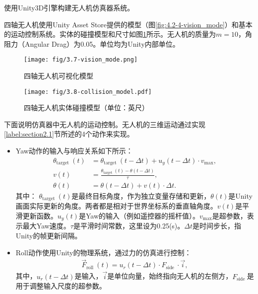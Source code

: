 使用Unity3D引擎构建无人机仿真器系统。

四轴无人机使用Unity Asset Store提供的模型（图\ref{fig:4.2-4-vision_mode}）和基本的运动控制系统。实体的碰撞模型和尺寸如图\ref{fig:4.2-3-collision_model}所示。无人机的质量为$m=10$，角阻力（Angular Drag）为0.05。单位均为Unity内部单位。

\begin{figure}[htbp]
    \centering
    \texttt{[image:  fig/3.7-vision\_mode.png]}
    \caption{四轴无人机可视化模型}
    \label{fig:4.2-4-vision_mode}

    \texttt{[image:  fig/3.8-collision\_model.pdf]}
    \caption{四轴无人机实体碰撞模型（单位：英尺）}
    \label{fig:4.2-3-collision_model}
\end{figure}

下面说明仿真器中无人机的运动控制。无人机的三维运动通过实现\ref{label:section2.1}节所述的4个动作来实现。

\begin{itemize}
    \item Yaw动作的输入与响应关系如下所示：
          \begin{equation}
              \begin{aligned}
                  \theta_{\text {target }}(t) & =\theta_{\text {target }}(t-\Delta t)+u_y(t-\Delta t) \cdot v_{\max }, \\
                  v(t)                        & =\frac{\theta_{\text {target }}(t)-\theta(t-\Delta t)}{\tau},          \\
                  \theta(t)                   & =\theta(t-\Delta t)+v(t) \cdot \Delta t .
              \end{aligned}
          \end{equation}
          其中：
          $\theta_{\text {target }}(t)$是最终目标角度，作为独立变量存储和更新，$\theta(t)$是Unity画面实际更新的角度。两者都是相对于世界坐标系的垂直轴角度。$v(t)$是平滑更新函数。$u_y(t)$是Yaw的输入（例如遥控器的摇杆值）。$v_{\max }$是超参数，表示最大Yaw速度。$\tau$是平滑时间常数，这里设为0.25(s)。$\Delta t$是时间步长，指Unity的帧更新间隔。
\end{itemize}

\begin{itemize}
    \item Roll动作使用Unity的物理系统，通过力的仿真进行控制：
          \begin{equation}
              \begin{gathered}
                  \vec{F}_{\text {roll }}(t)=u_r(t-\Delta t) \cdot F_{\text {side }} \cdot \vec{i},
              \end{gathered}
          \end{equation}
          其中，$u_r(t-\Delta t)$是输入，$\Vec{i}$是单位向量，始终指向无人机的左侧方，$F_{\text {side }}$是用于调整输入尺度的超参数。
\end{itemize}

